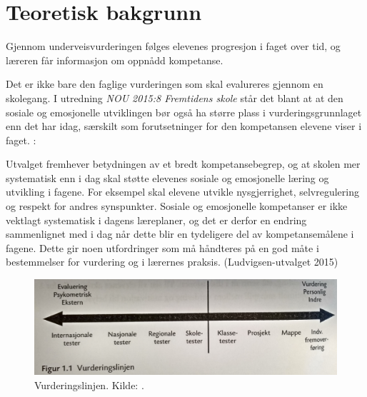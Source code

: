 \documentclass[main.tex]{subfiles}
\begin{document}
\section*{Teoretisk bakgrunn}
Gjennom underveisvurderingen følges elevenes progresjon i faget over tid, og læreren får informasjon
om oppnådd kompetanse.

Det er ikke bare den faglige vurderingen som skal evalureres gjennom en skolegang. 
I utredning \emph{NOU 2015:8 Fremtidens skole} står det blant at at den sosiale og 
emosjonelle utviklingen bør også ha større plass i vurderingsgrunnlaget enn det har idag, 
særskilt som forutsetninger for den kompetansen elevene viser i faget. :
\begin{displayquote}
Utvalget fremhever betydningen av et bredt kompetansebegrep,
og at skolen mer systematisk enn
i dag skal støtte elevenes sosiale og emosjonelle
læring og utvikling i fagene. For eksempel skal
elevene utvikle nysgjerrighet, selvregulering og
respekt for andres synspunkter. Sosiale og emosjonelle
kompetanser er ikke vektlagt systematisk
i dagens læreplaner, og det er derfor en endring
sammenlignet med i dag når dette blir en tydeligere
del av kompetansemålene i fagene. Dette
gir noen utfordringer som må håndteres på en
god måte i bestemmelser for vurdering og i lærernes
praksis. (Ludvigsen-utvalget 2015)
\end{displayquote}

\begin{figure}[h!]
\includegraphics[scale = 0.1]{../figures/vurderingslinjen.png}
\caption{Vurderingslinjen. Kilde: \protect{}.}
\end{figure}
\end{document}
